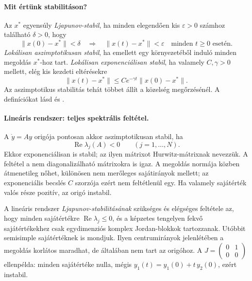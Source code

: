 \paragraph*{Mit értünk stabilitáson?}
Az $x^*$ egyensúly \emph{Ljapunov-stabil}, ha minden elegendően kis $\varepsilon>0$ számhoz található $\delta>0$, hogy
\begin{equation}\label{eq:lyapunov_stability_definition}
\|x(0)-x^*\|<\delta
\quad\Longrightarrow\quad
\|x(t)-x^*\|<\varepsilon\quad\text{minden }t\geq0\text{ esetén}.
\end{equation}
\emph{Lokálisan aszimptotikusan stabil}, ha emellett egy környezetéből induló minden megoldás $x^*$-hoz tart. \emph{Lokálisan exponenciálisan stabil}, ha valamely $C,\gamma>0$ mellett, elég kis kezdeti eltérésekre
\begin{equation}\label{eq:exponential_stability}
\|x(t)-x^*\|\leq Ce^{-\gamma t}\|x(0)-x^*\|.
\end{equation}
Az aszimptotikus stabilitás tehát többet állít a közelség megőrzésénél. A definíciókat lásd \cite[2.1.3. szakasz, 2.9--2.10. definíció]{dib} és \cite[1.3.3. szakasz]{kuznetsov_book}.

\paragraph*{Lineáris rendszer: teljes spektrális feltétel.}
A $\dot y=Ay$ origója pontosan akkor aszimptotikusan stabil, ha
\begin{equation}\label{eq:hurwitz_criterion}
\boxed{\operatorname{Re}\lambda_j(A)<0\qquad(j=1,\ldots,N).}
\end{equation}
Ekkor exponenciálisan is stabil; az ilyen mátrixot Hurwitz-mátrixnak nevezzük. A feltétel a nem diagonalizálható mátrixokra is igaz. A megoldás normája közben átmenetileg nőhet, különösen nem merőleges sajátirányok mellett; az exponenciális becslés $C$ szorzója ezért nem feltétlenül egy. Ha valamely sajátérték valós része pozitív, az origó instabil.

A lineáris rendszer \emph{Ljapunov-stabilitásának} szükséges és elégséges feltétele az, hogy minden sajátértékre $\operatorname{Re}\lambda_j\leq0$, és a képzetes tengelyen fekvő sajátértékekhez csak egydimenziós komplex Jordan-blokkok tartozzanak. Utóbbit semisimple sajátértéknek is mondjuk. Ilyen centrumirányok jelenlétében a megoldás korlátos maradhat, de általában nem tart az origóhoz. A $J=\left(\begin{smallmatrix}0&1\\0&0\end{smallmatrix}\right)$ ellenpélda: minden sajátértéke nulla, mégis $y_1(t)=y_1(0)+t\,y_2(0)$, ezért instabil.

